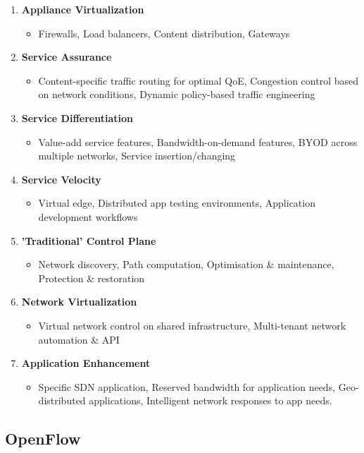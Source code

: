 \begin{enumerate}
\item \textbf{Appliance Virtualization}
	\begin{itemize}
	\item Firewalls, Load balancers, Content distribution, Gateways
	\end{itemize}
\item \textbf{Service Assurance}
	\begin{itemize}
	\item Content-specific traffic routing for optimal QoE, Congestion control based on network conditions, Dynamic policy-based traffic engineering 
	\end{itemize}
\item \textbf{Service Differentiation}
	\begin{itemize}
	\item Value-add service features, Bandwidth-on-demand features, BYOD across multiple networks, Service insertion/changing
	\end{itemize}
\item \textbf{Service Velocity}
	\begin{itemize}
	\item Virtual edge, Distributed app testing environments, Application development workflows 
	\end{itemize}
\item \textbf{'Traditional' Control Plane}
	\begin{itemize}
	\item Network discovery, Path computation, Optimisation \& maintenance, Protection \& restoration
	\end{itemize}
\item \textbf{Network Virtualization}
	\begin{itemize}
	\item Virtual network control on shared infrastructure, Multi-tenant network automation \& API
	\end{itemize}
\item \textbf{Application Enhancement}
	\begin{itemize}
	\item Specific SDN application, Reserved bandwidth for application needs, Geo-distributed applications, Intelligent network responses to app needs.\\
	\end{itemize}
\end{enumerate}


\subsection{OpenFlow\\}
\label{sec:openflow}

